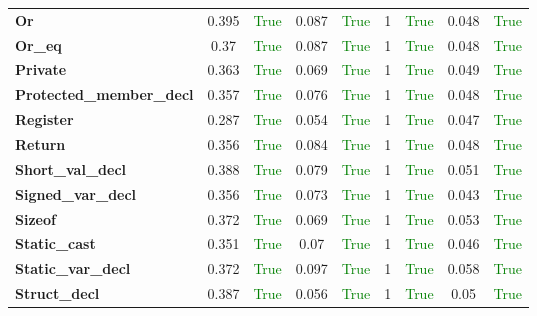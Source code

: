 \documentclass{article}
\begin{document}
\begin{xltabular}{\textwidth}{lcccccccc}
\textbf{{\fontsize{10}{12}\selectfont Or}}& 0.395&\textcolor{green}{True}& 0.087&\textcolor{green}{True}& 1&\textcolor{green}{True}& 0.048&\textcolor{green}{True} \\[0.5ex]
\textbf{{\fontsize{10}{12}\selectfont Or\_eq}}& 0.37&\textcolor{green}{True}& 0.087&\textcolor{green}{True}& 1&\textcolor{green}{True}& 0.048&\textcolor{green}{True} \\[0.5ex]
\textbf{{\fontsize{10}{12}\selectfont Private}}& 0.363&\textcolor{green}{True}& 0.069&\textcolor{green}{True}& 1&\textcolor{green}{True}& 0.049&\textcolor{green}{True} \\[0.5ex]
\textbf{{\fontsize{10}{12}\selectfont Protected\_member\_decl}}& 0.357&\textcolor{green}{True}& 0.076&\textcolor{green}{True}& 1&\textcolor{green}{True}& 0.048&\textcolor{green}{True} \\[0.5ex]
\textbf{{\fontsize{10}{12}\selectfont Register}}& 0.287&\textcolor{green}{True}& 0.054&\textcolor{green}{True}& 1&\textcolor{green}{True}& 0.047&\textcolor{green}{True} \\[0.5ex]
\textbf{{\fontsize{10}{12}\selectfont Return}}& 0.356&\textcolor{green}{True}& 0.084&\textcolor{green}{True}& 1&\textcolor{green}{True}& 0.048&\textcolor{green}{True} \\[0.5ex]
\textbf{{\fontsize{10}{12}\selectfont Short\_val\_decl}}& 0.388&\textcolor{green}{True}& 0.079&\textcolor{green}{True}& 1&\textcolor{green}{True}& 0.051&\textcolor{green}{True} \\[0.5ex]
\textbf{{\fontsize{10}{12}\selectfont Signed\_var\_decl}}& 0.356&\textcolor{green}{True}& 0.073&\textcolor{green}{True}& 1&\textcolor{green}{True}& 0.043&\textcolor{green}{True} \\[0.5ex]
\textbf{{\fontsize{10}{12}\selectfont Sizeof}}& 0.372&\textcolor{green}{True}& 0.069&\textcolor{green}{True}& 1&\textcolor{green}{True}& 0.053&\textcolor{green}{True} \\[0.5ex]
\textbf{{\fontsize{10}{12}\selectfont Static\_cast}}& 0.351&\textcolor{green}{True}& 0.07&\textcolor{green}{True}& 1&\textcolor{green}{True}& 0.046&\textcolor{green}{True} \\[0.5ex]
\textbf{{\fontsize{10}{12}\selectfont Static\_var\_decl}}& 0.372&\textcolor{green}{True}& 0.097&\textcolor{green}{True}& 1&\textcolor{green}{True}& 0.058&\textcolor{green}{True} \\[0.5ex]
\textbf{{\fontsize{10}{12}\selectfont Struct\_decl}}& 0.387&\textcolor{green}{True}& 0.056&\textcolor{green}{True}& 1&\textcolor{green}{True}& 0.05&\textcolor{green}{True} \\[0.5ex]

\end{xltabular}
\end{document}
